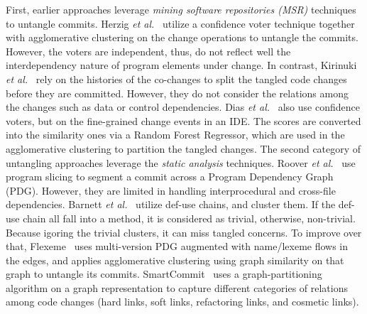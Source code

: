 First, earlier approaches leverage {\em mining software repositories
  (MSR)} techniques to untangle commits. Herzig {\em et
  al.}~\cite{kim-msr13,kim-emse16} utilize a confidence voter
technique together with agglomerative clustering on the change
operations to untangle the commits.
However, the voters are independent, thus, do not reflect well the
interdependency nature of program elements under change. In contrast,
Kirinuki {\em et al.}~\cite{higo-apsec16, higo-icpc14} rely on the
histories of the co-changes to split the tangled code changes before
they are committed. However, they do not consider the relations among
the changes such as data or control dependencies. Dias {\em et
  al.}~\cite{dias-saner15} also use confidence voters, but on the
fine-grained change events in an IDE. The scores are converted into
the similarity ones via a Random Forest Regressor, which are used in
the agglomerative clustering to partition the tangled changes.  The
second category of untangling approaches leverage the {\em static
  analysis} techniques. Roover {\em et al.}~\cite{roover-scam18} use
program slicing to segment a commit across a Program Dependency Graph
(PDG).  However, they are limited in handling interprocedural and
cross-file dependencies. Barnett {\em et al.}~\cite{barnett-icse15}
utilize def-use chains, and cluster them. If the def-use chain all
fall into a method, it is considered as trivial, otherwise,
non-trivial. Because igoring the trivial clusters, it can miss tangled
concerns. To improve over that, Flexeme~\cite{flexeme-fse20} uses
multi-version PDG augmented with name/lexeme flows in the edges, and
applies agglomerative clustering using graph similarity on that graph
to untangle its commits. SmartCommit~\cite{smartcommit-fse21} uses a
graph-partitioning algorithm on a graph representation to capture
different categories of relations among code changes (hard links, soft
links, refactoring links, and cosmetic links).


